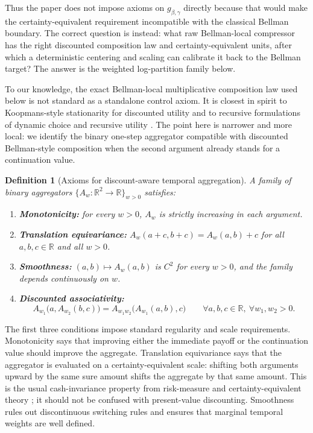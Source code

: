 \documentclass{article}
\newtheorem{definition}[definition]{Definition}
\theoremstyle{remark}
\newcommand{\R}{\mathbb{R}}
\begin{document}
Thus the paper does not impose axioms on $g_{\beta,\gamma}$ directly because that would make the certainty-equivalent requirement incompatible with the classical Bellman boundary. The correct question is instead: what raw Bellman-local compressor has the right discounted composition law and certainty-equivalent units, after which a deterministic centering and scaling can calibrate it back to the Bellman target? The answer is the weighted log-partition family below.

To our knowledge, the exact Bellman-local multiplicative composition law used below is not standard as a standalone control axiom. It is closest in spirit to Koopmans-style stationarity for discounted utility and to recursive formulations of dynamic choice and recursive utility \citep{koopmans1960stationary,kreps1978temporal,epstein1989substitution}. The point here is narrower and more local: we identify the binary one-step aggregator compatible with discounted Bellman-style composition when the second argument already stands for a continuation value.

\begin{definition}[Axioms for discount-aware temporal aggregation]
\label{def:axioms}
A family of binary aggregators $\{A_w:\R^2\to\R\}_{w>0}$ satisfies:
\begin{enumerate}[label=(A\arabic*),leftmargin=1.5em]
    \item \textbf{Monotonicity:} for every $w>0$, $A_w$ is strictly increasing in each argument.
    \item \textbf{Translation equivariance:} $A_w(a+c,b+c)=A_w(a,b)+c$ for all $a,b,c\in\R$ and all $w>0$.
    \item \textbf{Smoothness:} $(a,b)\mapsto A_w(a,b)$ is $C^2$ for every $w>0$, and the family depends continuously on $w$.
    \item \textbf{Discounted associativity:}
    \begin{equation}
    A_{w_1}\bigl(a,A_{w_2}(b,c)\bigr)
    =
    A_{w_1w_2}\bigl(A_{w_1}(a,b),c\bigr)
    \qquad \forall a,b,c\in\R,\ \forall w_1,w_2>0.
    \label{eq:discounted-assoc-axiom}
    \end{equation}
\end{enumerate}
\end{definition}

The first three conditions impose standard regularity and scale requirements. Monotonicity says that
improving either the immediate payoff or the continuation value should improve the aggregate.
Translation equivariance says that the aggregator is evaluated on a certainty-equivalent scale: shifting
both arguments upward by the same sure amount shifts the aggregate by that same amount. This is
the usual cash-invariance property from risk-measure and certainty-equivalent theory
\citep{artzner1999coherent,follmer2016stochastic}; it should not be confused with present-value
discounting. Smoothness rules out discontinuous switching rules and ensures that marginal temporal
weights are well defined.
\end{document}
